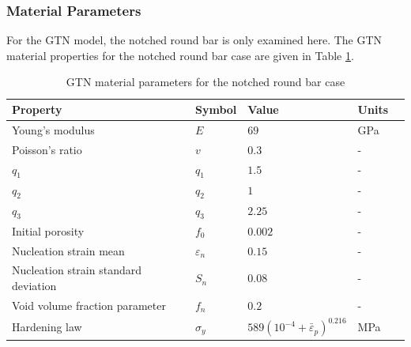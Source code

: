 \documentclass[sn-mathphys,Numbered]{sn-jnl}%
\begin{document}
\subsubsection{Material Parameters}
For the GTN model, the notched round bar is only examined here.
The GTN material properties for the notched round bar case are given in Table \ref{table:NRB_material_properties_GTN}.
\begin{table}[htb]
	\centering
		\begin{tabular}{lllll} \hline
		    Property & Symbol & Value & Units  \\ \hline 
		    Young's modulus & $E$ & $69$ & GPa \\
		    Poisson's ratio & $v$ & $0.3$   & - \\
		    $q_1$ & $q_1$ & $1.5$  & -\\
		    $q_2$ & $q_2$ & $1$  & -\\
		    $q_3$ & $q_3$ & $2.25$  & -\\
		    Initial porosity & $f_0$ & $0.002$  &  -\\
		    Nucleation strain mean & $\varepsilon_n$ & $0.15$  &  -\\
		    Nucleation strain standard deviation & $S_n$ & $0.08$  &  -\\
		    Void volume fraction parameter & $f_n$ & $0.2$  & -\\
		    Hardening law & $\sigma_y$ & $589({10^{-4}+\bar{\varepsilon}}_p)^{0.216}$ & MPa  \\
		\hline
		\end{tabular}
	\caption{GTN material parameters for the notched round bar case}
	\label{table:NRB_material_properties_GTN}
\end{table}


\end{document}
